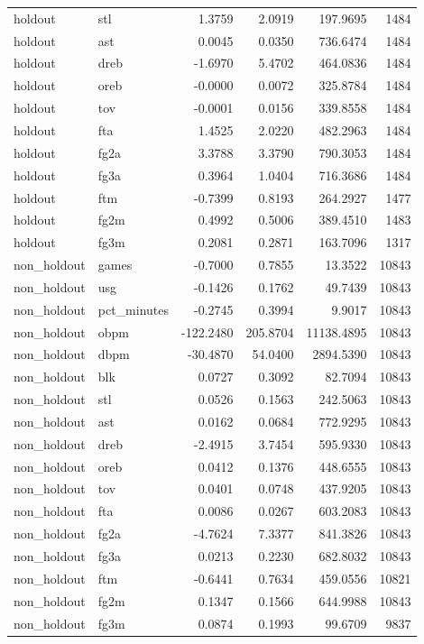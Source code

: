 \begin{table}
\begin{tabular}{llrrrr}
holdout & stl & 1.3759 & 2.0919 & 197.9695 & 1484 \\
holdout & ast & 0.0045 & 0.0350 & 736.6474 & 1484 \\
holdout & dreb & -1.6970 & 5.4702 & 464.0836 & 1484 \\
holdout & oreb & -0.0000 & 0.0072 & 325.8784 & 1484 \\
holdout & tov & -0.0001 & 0.0156 & 339.8558 & 1484 \\
holdout & fta & 1.4525 & 2.0220 & 482.2963 & 1484 \\
holdout & fg2a & 3.3788 & 3.3790 & 790.3053 & 1484 \\
holdout & fg3a & 0.3964 & 1.0404 & 716.3686 & 1484 \\
holdout & ftm & -0.7399 & 0.8193 & 264.2927 & 1477 \\
holdout & fg2m & 0.4992 & 0.5006 & 389.4510 & 1483 \\
holdout & fg3m & 0.2081 & 0.2871 & 163.7096 & 1317 \\
non\_holdout & games & -0.7000 & 0.7855 & 13.3522 & 10843 \\
non\_holdout & usg & -0.1426 & 0.1762 & 49.7439 & 10843 \\
non\_holdout & pct\_minutes & -0.2745 & 0.3994 & 9.9017 & 10843 \\
non\_holdout & obpm & -122.2480 & 205.8704 & 11138.4895 & 10843 \\
non\_holdout & dbpm & -30.4870 & 54.0400 & 2894.5390 & 10843 \\
non\_holdout & blk & 0.0727 & 0.3092 & 82.7094 & 10843 \\
non\_holdout & stl & 0.0526 & 0.1563 & 242.5063 & 10843 \\
non\_holdout & ast & 0.0162 & 0.0684 & 772.9295 & 10843 \\
non\_holdout & dreb & -2.4915 & 3.7454 & 595.9330 & 10843 \\
non\_holdout & oreb & 0.0412 & 0.1376 & 448.6555 & 10843 \\
non\_holdout & tov & 0.0401 & 0.0748 & 437.9205 & 10843 \\
non\_holdout & fta & 0.0086 & 0.0267 & 603.2083 & 10843 \\
non\_holdout & fg2a & -4.7624 & 7.3377 & 841.3826 & 10843 \\
non\_holdout & fg3a & 0.0213 & 0.2230 & 682.8032 & 10843 \\
non\_holdout & ftm & -0.6441 & 0.7634 & 459.0556 & 10821 \\
non\_holdout & fg2m & 0.1347 & 0.1566 & 644.9988 & 10843 \\
non\_holdout & fg3m & 0.0874 & 0.1993 & 99.6709 & 9837 \\
\bottomrule
\end{tabular}
\end{table}
